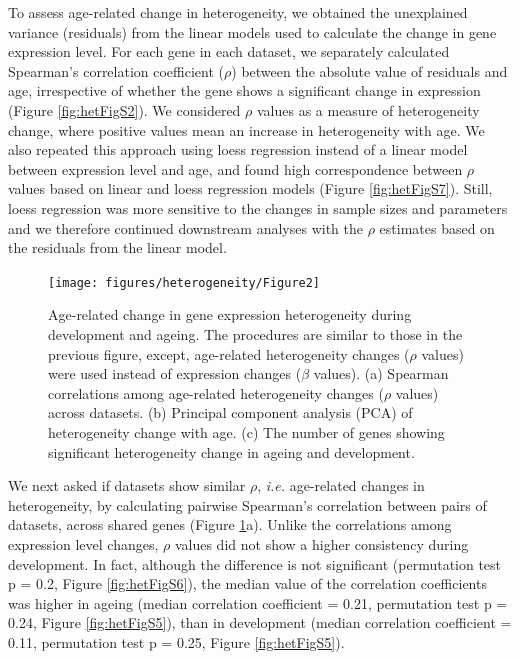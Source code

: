 \documentclass[12pt,twoside]{unicam}
\begin{document}
To assess age-related change in heterogeneity, we obtained the unexplained variance (residuals) from the linear models used to calculate the change in gene expression level. For each gene in each dataset, we separately calculated Spearman's correlation coefficient (\(\rho\)) between the absolute value of residuals and age, irrespective of whether the gene shows a significant change in expression (Figure \ref{fig:hetFigS2}). We considered \(\rho\) values as a measure of heterogeneity change, where positive values mean an increase in heterogeneity with age. We also repeated this approach using loess regression instead of a linear model between expression level and age, and found high correspondence between \(\rho\) values based on linear and loess regression models (Figure \ref{fig:hetFigS7}). Still, loess regression was more sensitive to the changes in sample sizes and parameters and we therefore continued downstream analyses with the \(\rho\) estimates based on the residuals from the linear model.

\begin{figure}

{\centering \texttt{[image: figures/heterogeneity/Figure2]} 

}

\caption[Age-related change in gene expression heterogeneity during postnatal development and ageing.]{Age-related change in gene expression heterogeneity during development and ageing. The procedures are similar to those in the previous figure, except, age-related heterogeneity changes ($\rho$ values) were used instead of expression changes ($\beta$ values). (a) Spearman correlations among age-related heterogeneity changes ($\rho$  values) across datasets. (b) Principal component analysis (PCA) of heterogeneity change with age. (c) The number of genes showing significant heterogeneity change in ageing and development.}\label{fig:hetFig2}
\end{figure}

We next asked if datasets show similar \(\rho\), \emph{i.e.} age-related changes in heterogeneity, by calculating pairwise Spearman's correlation between pairs of datasets, across shared genes (Figure \ref{fig:hetFig2}a). Unlike the correlations among expression level changes, \(\rho\) values did not show a higher consistency during development. In fact, although the difference is not significant (permutation test p = 0.2, Figure \ref{fig:hetFigS6}), the median value of the correlation coefficients was higher in ageing (median correlation coefficient = 0.21, permutation test p = 0.24, Figure \ref{fig:hetFigS5}), than in development (median correlation coefficient = 0.11, permutation test p = 0.25, Figure \ref{fig:hetFigS5}).
\end{document}
